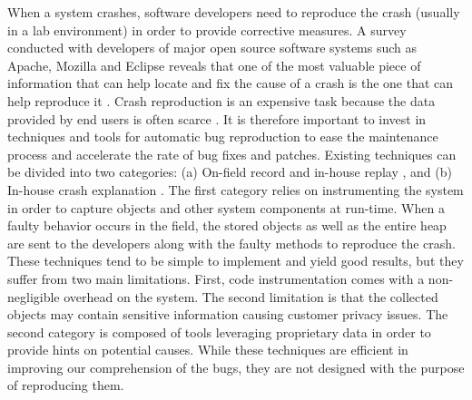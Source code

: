 When a system crashes, software developers need to reproduce the crash (usually in a lab environment) in order to provide corrective measures.
A survey conducted with developers of major open source software systems such as Apache, Mozilla and Eclipse reveals that one of the most valuable piece of information that can help locate and fix the cause of a crash is the one that can help reproduce it \cite{Bettenburg2008}.
Crash reproduction is  an expensive task because the data provided by end users is often scarce \cite{Artzi2008,Jin2012,Chen2013}.
It is therefore important to invest in techniques and tools for automatic bug reproduction to ease the maintenance process and accelerate the rate of bug fixes and patches.
Existing techniques can be divided into two categories: (a) On-field record and in-house replay \cite{Steven2000,Narayanasamy2005,Artzi2008,Roehm2015}, and (b) In-house crash explanation \cite{Jin2012,Jin2013,Zuddas2014,Chen2013a,Nayrolles2015}.
The first category relies on instrumenting the system in order to capture objects and other system components at run-time.
When a faulty behavior occurs in the field, the stored objects as well as the entire heap are sent to the developers along with the faulty methods to reproduce the crash.
These techniques tend to be simple to implement and yield good results, but they suffer from two main limitations.
First, code instrumentation comes with a non-negligible overhead on the system.
The second limitation is that the collected objects may contain sensitive information causing customer privacy issues.
The second category is composed of tools leveraging proprietary data in order to provide hints on potential causes.
While these techniques are efficient in improving our comprehension of the bugs, they are not designed with the purpose of reproducing them.

